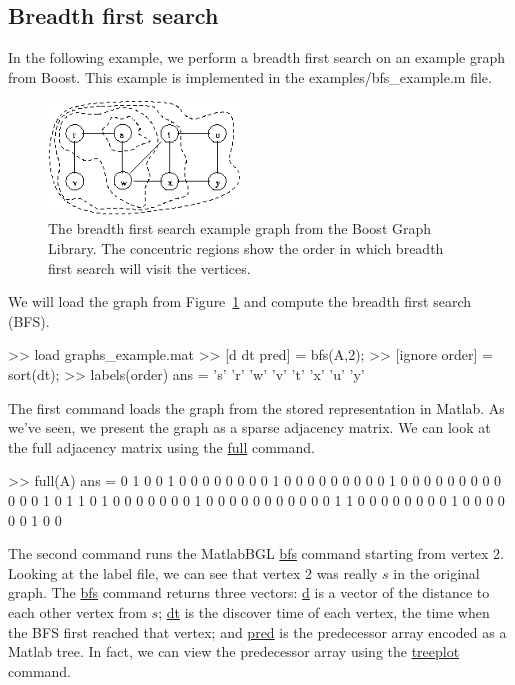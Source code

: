 \documentclass[12pt]{article}
\newcommand{\mycmd}[1]{\url{#1}}
\newcommand{\mypath}[1]{{\ttfamily \small #1}}
\begin{document}
\subsection{Breadth first search}

In the following example, we perform a breadth first search on an example graph from Boost.  This example is implemented in the \mypath{examples/bfs\_example.m} file.

\begin{figure}[ht!]
\centering
\includegraphics[width=2in]{bfs_example}
\caption{The breadth first search example graph from the Boost Graph Library.  The concentric regions show the order in which breadth first search will visit the vertices.}
\label{fig:bfs}
\end{figure}

We will load the graph from Figure~\ref{fig:bfs} and compute the breadth first search (BFS).

\begin{mcode}
>> load graphs\bfs_example.mat
>> [d dt pred] = bfs(A,2);
>> [ignore order] = sort(dt);
>> labels(order)
ans = 
    's'
    'r'
    'w'
    'v'
    't'
    'x'
    'u'
    'y'
\end{mcode}

The first command loads the graph from the stored representation in Matlab.  As we've seen, we present the graph as a sparse adjacency matrix.  We can look at the full adjacency matrix using the \mycmd{full} command.

\begin{mcode}
>> full(A)
ans =
     0     1     0     0     1     0     0     0     0
     0     0     0     0     1     0     0     0     0
     0     0     0     0     0     1     0     0     0
     0     0     0     0     0     0     0     0     0
     1     0     1     1     0     1     0     0     0
     0     0     0     0     1     0     0     0     0
     0     0     0     0     0     0     0     1     1
     0     0     0     0     0     0     0     0     1
     0     0     0     0     0     0     1     0     0
\end{mcode}

The second command runs the MatlabBGL \mycmd{bfs} command starting from vertex 2.  Looking at the label file, we can see that vertex 2 was really $s$ in the original graph.  The \mycmd{bfs} command returns three vectors: \mycmd{d} is a vector of the distance to each other vertex from $s$; \mycmd{dt} is the discover time of each vertex, the time when the BFS first reached that vertex; and \mycmd{pred} is the predecessor array encoded as a Matlab tree.  In fact, we can view the predecessor array using the \mycmd{treeplot} command.
\end{document}
